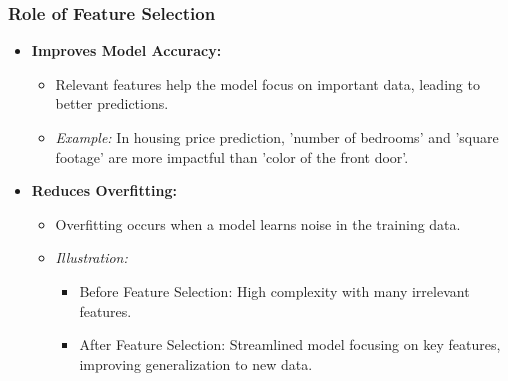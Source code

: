 \documentclass[aspectratio=169]{beamer}
\begin{document}
\begin{frame}[fragile]
    \frametitle{Role of Feature Selection}
    \begin{itemize}
        \item \textbf{Improves Model Accuracy:}
        \begin{itemize}
            \item Relevant features help the model focus on important data, leading to better predictions.
            \item \textit{Example:} In housing price prediction, 'number of bedrooms' and 'square footage' are more impactful than 'color of the front door'.
        \end{itemize}
        
        \item \textbf{Reduces Overfitting:}
        \begin{itemize}
            \item Overfitting occurs when a model learns noise in the training data.
            \item \textit{Illustration:}
            \begin{itemize}
                \item Before Feature Selection: High complexity with many irrelevant features.
                \item After Feature Selection: Streamlined model focusing on key features, improving generalization to new data.
            \end{itemize}
        \end{itemize}
    \end{itemize}
\end{frame}
\end{document}

